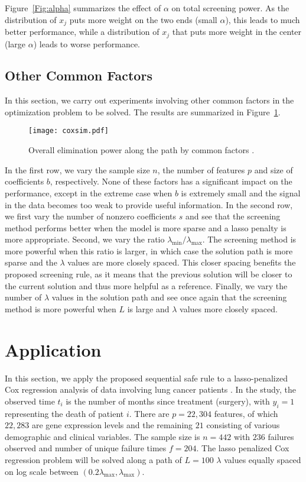 Figure~\ref{Fig:alpha} summarizes the effect of $\alpha$ on total screening power. As the distribution of $x_j$ puts more weight on the two ends (small $\alpha$), this leads to much better performance, while a distribution of $x_j$ that puts more weight in the center (large $\alpha$) leads to worse performance.

\subsection{Other Common Factors}

In this section, we carry out experiments involving other common factors in the optimization problem to be solved. The results are summarized in Figure~\ref{Fig:coxsim}.

\begin{figure}[ht]
    \centering
    \texttt{[image: coxsim.pdf]}    
    \caption{Overall elimination power along the path by common factors \label{Fig:coxsim}.}
\end{figure}

In the first row, we vary the sample size $n$, the number of features $p$ and size of coefficients $b$, respectively. None of these factors has a significant impact on the performance, except in the extreme case when $b$ is extremely small and the signal in the data becomes too weak to provide useful information. In the second row, we first vary the number of nonzero coefficients $s$ and see that the screening method performs better when the model is more sparse and a lasso penalty is more appropriate. Second, we vary the ratio $\lambda_{\min}/\lambda_{\max}$. The screening method is more powerful when this ratio is larger, in which case the solution path is more sparse and the $\lambda$ values are more closely spaced. This closer spacing benefits the proposed screening rule, as it means that the previous solution will be closer to the current solution and thus more helpful as a reference. Finally, we vary the number of $\lambda$ values in the solution path and see once again that the screening method is more powerful when $L$ is large and $\lambda$ values more closely spaced.

\section{Application}

In this section, we apply the proposed sequential safe rule to a lasso-penalized Cox regression analysis of data involving lung cancer patients \citep{shedden2008gene}. In the study, the observed time $t_i$ is the number of months since treatment (surgery), with $y_i=1$ representing the death of patient $i$. There are $p=22,304$ features, of which $22,283$ are gene expression levels and the remaining $21$ consisting of various demographic and clinical variables. The sample size is $n=442$ with $236$ failures observed and number of unique failure times $f=204$. The lasso penalized Cox regression problem will be solved along a path of $L=100$ $\lambda$ values equally spaced on log scale between $(0.2\lambda_{\max},\lambda_{\max})$. 

